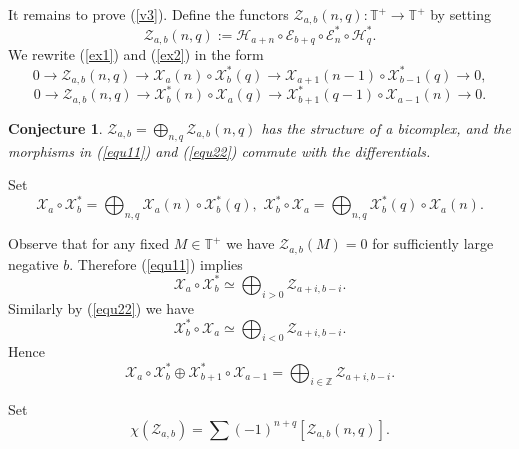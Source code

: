 \documentclass[11pt]{amsart}
\newcounter{theorem}
\newtheorem{conjecture}[theo]{Conjecture}
\newcommand{\TT}{\mathbb{T}}
\begin{document}
 
It remains to prove (\ref{v3}). Define the functors  $\mathcal Z_{a,b}(n,q):\TT^+\to \TT^+$ by setting
$$\mathcal Z_{a,b}(n,q):=\mathcal H_{a+n}\circ  \mathcal E_{b+q}\circ \mathcal E^*_{n}\circ \mathcal H^*_{q}.$$
We rewrite (\ref{ex1}) and (\ref{ex2}) in the form
\begin{equation}\label{equ11}
0\to \mathcal Z_{a,b}(n,q)\to \mathcal X_a(n)\circ\mathcal X^*_b(q)\to \mathcal X_{a+1}(n-1)\circ\mathcal X^*_{b-1}(q)\to 0,
\end{equation}
\begin{equation}\label{equ22}
0\to \mathcal Z_{a,b}(n,q)\to \mathcal X^*_b(n)\circ\mathcal X_a(q)\to \mathcal X^*_{b+1}(q-1)\circ\mathcal X_{a-1}(n)\to 0.
\end{equation}

\begin{conjecture} $\mathcal Z_{a,b}=\bigoplus_{n,q}\mathcal Z_{a,b}(n,q)$ has the structure of a bicomplex,
and the morphisms in (\ref{equ11}) and (\ref{equ22}) commute with the differentials.
\end{conjecture}

Set
\begin{equation}\label{bicomplexfunctor1}
\mathcal X_a\circ\mathcal X^*_b=\bigoplus_{n,q} \mathcal X_a(n)\circ\mathcal X^*_b(q),\,\,
\mathcal X_b^*\circ\mathcal X_a=\bigoplus_{n,q} \mathcal X^*_b(q)\circ\mathcal X_a(n).\nonumber
\end{equation}

Observe that for any fixed $M\in\TT^+$ we have  $\mathcal Z_{a,b}(M)=0$ for
sufficiently large negative $b$.
Therefore (\ref{equ11}) implies
$$\mathcal X_a\circ\mathcal X^*_b\simeq\bigoplus_{i>0}\mathcal Z_{a+i,b-i}.$$
Similarly by  (\ref{equ22})  we have
$$\mathcal X^*_b\circ\mathcal X_a\simeq\bigoplus_{i<0}\mathcal Z_{a+i,b-i}.$$
Hence 
\begin{equation}\label{sum}
\mathcal X_a\circ\mathcal X^*_b\oplus \mathcal
X^*_{b+1}\circ\mathcal X_{a-1}=\bigoplus_{i\in\mathbb Z}\mathcal Z_{a+i,b-i}.\nonumber
\end{equation}

Set $$\chi( \mathcal Z_{a,b})=\sum(-1)^{n+q}[ \mathcal Z_{a,b}(n,q)].$$
\end{document}
